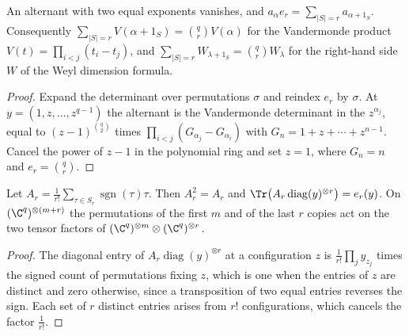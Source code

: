 \begin{lemma}
    \label{lem:alternant_pieri}
    \leanok
    An alternant with two equal exponents vanishes, and
    $a_\alpha e_r=\sum_{|S|=r}a_{\alpha+1_S}$. Consequently
    $\sum_{|S|=r}V(\alpha+1_S)=\binom qrV(\alpha)$ for the Vandermonde product
    $V(t)=\prod_{i<j}(t_i-t_j)$, and
    $\sum_{|S|=r}W_{\lambda+1_S}=\binom qrW_\lambda$ for the right-hand side $W$ of the
    Weyl dimension formula.
\end{lemma}

\begin{proof}\leanok
    Expand the determinant over permutations $\sigma$ and reindex $e_r$ by $\sigma$. At
    $y=(1,z,\dots,z^{q-1})$ the alternant is the Vandermonde determinant in the
    $z^{\alpha_j}$, equal to $(z-1)^{\binom q2}$ times $\prod_{i<j}(G_{\alpha_j}-G_{\alpha_i})$
    with $G_n=1+z+\cdots+z^{n-1}$. Cancel the power of $z-1$ in the polynomial ring and set
    $z=1$, where $G_n=n$ and $e_r=\binom qr$.
\end{proof}

\begin{lemma}
    \label{lem:exterior_character}
    \leanok
    Let $A_r=\frac1{r!}\sum_{\tau\in S_r}\operatorname{sgn}(\tau)\tau$. Then $A_r^2=A_r$ and
    $\Tr\bigl(A_r\operatorname{diag}(y)^{\otimes r}\bigr)=e_r(y)$. On $(\C^q)^{\otimes(m+r)}$
    the permutations of the first $m$ and of the last $r$ copies act on the two tensor
    factors of $(\C^q)^{\otimes m}\otimes(\C^q)^{\otimes r}$.
\end{lemma}

\begin{proof}\leanok
    The diagonal entry of $A_r\operatorname{diag}(y)^{\otimes r}$ at a configuration
    $z$ is $\frac1{r!}\prod_jy_{z_j}$ times the signed count of permutations fixing $z$,
    which is one when the entries of $z$ are distinct and zero otherwise, since a
    transposition of two equal entries reverses the sign. Each set of $r$ distinct entries
    arises from $r!$ configurations, which cancels the factor $\frac1{r!}$.
\end{proof}

